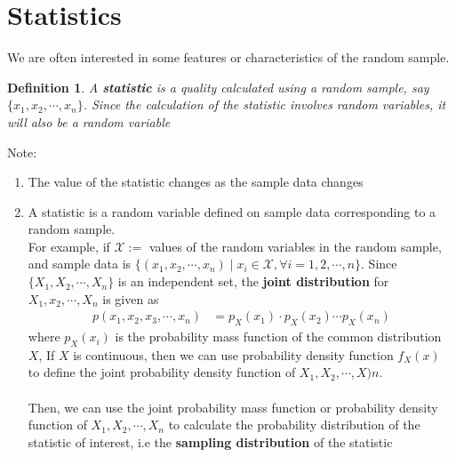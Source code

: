 \documentclass[11pt,oneside]{book}
\theoremstyle{newStyle}
\newtheorem{defn}[thm]{Definition}
\newcommand{\X}{\mathcal{X}}
\newcommand{\note}{\color{red}Note: \color{black}}
\begin{document}
\section[Statistics]{Statistics}
We are often interested in some features or characteristics of the random sample.
\begin{defn}
A \textbf{statistic} is a quality calculated using a random sample, say $\{x_1,x_2,\cdots,x_n\}$. Since the calculation of the statistic involves random variables, it will also be a random variable
\end{defn}
\note \begin{enumerate}
\item The value of the statistic changes as the sample data changes
\item A statistic is a random variable defined on sample data corresponding  to a random sample.\\ 
For example, if $\X:=$ values of the random variables in the random sample, and sample data is $\{(x_1,x_2,\cdots,x_n)\mid x_i\in \X,\forall i =1,2,\cdots,n\}$. Since $\{X_1,X_2,\cdots,X_n\}$ is an independent set, the \textbf{joint distribution} for $X_1,x_2,\cdots,X_n$ is given as \begin{align*}
p(x_1,x_2,x_3,\cdots,x_n)&=p_X(x_1)\cdot p_X(x_2)\cdots p_X(x_n)
\end{align*} 
where $p_X(x_i)$ is the probability mass function of the common distribution $X$, If $X$ is continuous, then we can use probability density function $f_X(x)$ to define the joint probability density function of $X_1,X_2,\cdots,X)n$.\\
\hfill\\
Then, we can use the joint probability mass function or probability density function of $X_1,X_2,\cdots,X_n$ to calculate the probability distribution of the statistic of interest, i.e the \textbf{sampling distribution} of the statistic\\
\end{enumerate}
\end{document}
